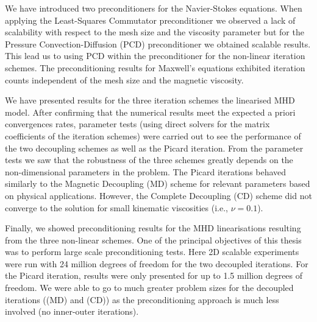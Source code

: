 We have introduced two preconditioners for the Navier-Stokes equations. When  applying the Least-Squares Commutator preconditioner we  observed a lack of scalability with respect to the mesh size and the viscosity parameter but for the  Pressure Convection-Diffusion (PCD) preconditioner we obtained scalable results. This  lead us to  using PCD within the preconditioner for the non-linear iteration schemes. The preconditioning results for Maxwell's equations exhibited iteration counts independent of the mesh size and the magnetic viscosity.


We have presented results for the three iteration schemes the linearised MHD model. After confirming that the numerical results  meet the expected a priori convergences rates, parameter tests (using direct solvers for the matrix coefficients of the iteration schemes) were carried out to see the performance of the two decoupling schemes as well as the Picard iteration. From the parameter tests we saw that the robustness of the three schemes greatly depends on the non-dimensional parameters in the problem. The Picard iterations behaved  similarly to the Magnetic Decoupling (MD) scheme for relevant parameters based on physical applications. However, the Complete Decoupling (CD) scheme did not converge to the solution for small kinematic viscosities (i.e., $\nu = 0.1$).

Finally, we showed preconditioning results for the MHD linearisations resulting from the three non-linear schemes. One of the principal objectives of this thesis was to perform large scale  preconditioning tests. Here 2D scalable experiments were run with 24 million degrees of freedom for the two decoupled iterations. For the Picard iteration, results were only presented for up to 1.5 million degrees of freedom. We were able to go to much greater problem sizes for the decoupled iterations ((MD) and (CD)) as the preconditioning approach is much less involved (no inner-outer iterations).

